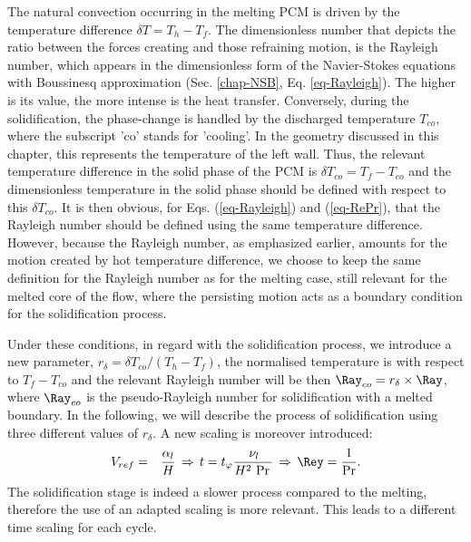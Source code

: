 The natural convection occurring in the melting PCM is driven by the temperature difference $\delta T = T_h - T_f$. 
The dimensionless number that depicts the ratio between the forces creating and those refraining motion, is the Rayleigh number, which appears in the dimensionless form of the Navier-Stokes equations with Boussinesq approximation (Sec. \ref{chap-NSB}, Eq. \ref{eq-Rayleigh}). 
The higher is its value, the more intense is the heat transfer.
Conversely, during the solidification, the phase-change is handled by the discharged temperature $T_{co}$, where the subscript 'co' stands for 'cooling'. 
In the geometry discussed in this chapter, this represents the temperature of the left wall. 
Thus, the relevant temperature difference in the solid phase of the PCM is $\delta T_{co} = T_f-T_{co}$ and the dimensionless temperature in the solid phase should be defined with respect to this $\delta T_{co}$. 
It is then obvious, for Eqs. (\ref{eq-Rayleigh}) and (\ref{eq-RePr}),  that the Rayleigh number should be defined using the same temperature difference.  
However, because the Rayleigh number, as emphasized earlier, amounts for the motion created by hot temperature difference, we choose to keep the same definition for the Rayleigh number as for the melting case, still relevant for the melted core of the flow, where the persisting motion acts as a boundary condition for the solidification process.    

Under these conditions, in regard with the solidification process, we introduce  a new parameter,  $r_{\delta} = \delta T_{co}/(T_h-T_f)$, the normalised temperature is with respect to 
$T_f-T_{co}$ and the relevant Rayleigh number will be then  $\Ray_{co}= r_{\delta} \times \Ray$, where $\Ray_{co}$ is the pseudo-Rayleigh number for solidification with a melted boundary. 
In the following, we will  describe  the process of solidification using three different values of $r_{\delta}$. 
A new scaling is moreover introduced: 
\begin{eqnarray}\label{ref-adimPCM2}
V_{ref}&=&\frac{\alpha_l}{H}  \, \Rightarrow  \, t = t_{\varphi} \frac{\, \nu_l }{ H^2 \, \Pr \,}\, \Rightarrow  \, \Rey  = \frac{1}{\Pr}.  \label{ref-adimdT} 
\end{eqnarray}
The solidification stage is indeed a slower process compared to the melting, therefore the use of an adapted scaling is more relevant.
This leads to a different time scaling for each cycle.

